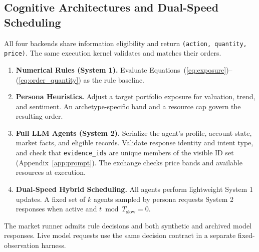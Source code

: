 \subsection{Cognitive Architectures and Dual-Speed Scheduling}
\label{sec:method:cognition}

All four backends share information eligibility and return \texttt{(action, quantity, price)}. The same execution kernel validates and matches their orders.
\begin{enumerate}[leftmargin=*, label=(\arabic*)]
  \item \textbf{Numerical Rules (System 1).} Evaluate Equations~(\ref{eq:exposure})--(\ref{eq:order_quantity}) as the rule baseline.
  \item \textbf{Persona Heuristics.} Adjust a target portfolio exposure for valuation, trend, and sentiment. An archetype-specific band and a resource cap govern the resulting order.
  \item \textbf{Full LLM Agents (System 2).} Serialize the agent's profile, account state, market facts, and eligible records. Validate response identity and intent type, and check that \texttt{evidence\_ids} are unique members of the visible ID set (Appendix~\ref{app:prompt}). The exchange checks price bands and available resources at execution.
  \item \textbf{Dual-Speed Hybrid Scheduling.} All agents perform lightweight System 1 updates. A fixed set of $k$ agents sampled by persona requests System 2 responses when active and $t\bmod T_{\mathrm{slow}}=0$.
\end{enumerate}

The market runner admits rule decisions and both synthetic and archived model responses. Live model requests use the same decision contract in a separate fixed-observation harness.

